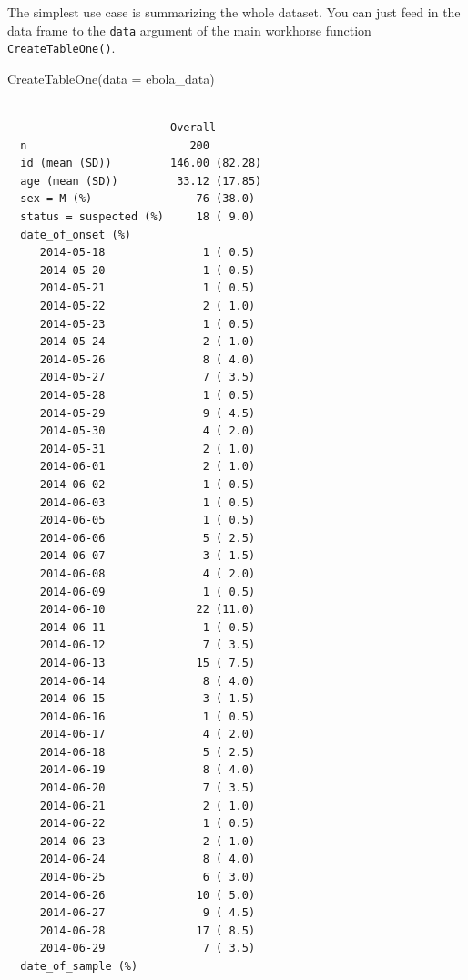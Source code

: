 \documentclass[
  letterpaper,
  DIV=11,
  numbers=noendperiod]{scrreprt}
\newenvironment{Shaded}{\begin{snugshade}}{\end{snugshade}}
\newcommand{\AttributeTok}[1]{\textcolor[rgb]{0.40,0.45,0.13}{#1}}
\newcommand{\FunctionTok}[1]{\textcolor[rgb]{0.28,0.35,0.67}{#1}}
\newcommand{\NormalTok}[1]{\textcolor[rgb]{0.00,0.23,0.31}{#1}}
\begin{document}
The simplest use case is summarizing the whole dataset. You can just
feed in the data frame to the \texttt{data} argument of the main
workhorse function \texttt{CreateTableOne()}.

\begin{Shaded}
\begin{Highlighting}[]
\FunctionTok{CreateTableOne}\NormalTok{(}\AttributeTok{data =}\NormalTok{ ebola\_data)}
\end{Highlighting}
\end{Shaded}

\begin{verbatim}
                        
                         Overall       
  n                         200        
  id (mean (SD))         146.00 (82.28)
  age (mean (SD))         33.12 (17.85)
  sex = M (%)                76 (38.0) 
  status = suspected (%)     18 ( 9.0) 
  date_of_onset (%)                    
     2014-05-18               1 ( 0.5) 
     2014-05-20               1 ( 0.5) 
     2014-05-21               1 ( 0.5) 
     2014-05-22               2 ( 1.0) 
     2014-05-23               1 ( 0.5) 
     2014-05-24               2 ( 1.0) 
     2014-05-26               8 ( 4.0) 
     2014-05-27               7 ( 3.5) 
     2014-05-28               1 ( 0.5) 
     2014-05-29               9 ( 4.5) 
     2014-05-30               4 ( 2.0) 
     2014-05-31               2 ( 1.0) 
     2014-06-01               2 ( 1.0) 
     2014-06-02               1 ( 0.5) 
     2014-06-03               1 ( 0.5) 
     2014-06-05               1 ( 0.5) 
     2014-06-06               5 ( 2.5) 
     2014-06-07               3 ( 1.5) 
     2014-06-08               4 ( 2.0) 
     2014-06-09               1 ( 0.5) 
     2014-06-10              22 (11.0) 
     2014-06-11               1 ( 0.5) 
     2014-06-12               7 ( 3.5) 
     2014-06-13              15 ( 7.5) 
     2014-06-14               8 ( 4.0) 
     2014-06-15               3 ( 1.5) 
     2014-06-16               1 ( 0.5) 
     2014-06-17               4 ( 2.0) 
     2014-06-18               5 ( 2.5) 
     2014-06-19               8 ( 4.0) 
     2014-06-20               7 ( 3.5) 
     2014-06-21               2 ( 1.0) 
     2014-06-22               1 ( 0.5) 
     2014-06-23               2 ( 1.0) 
     2014-06-24               8 ( 4.0) 
     2014-06-25               6 ( 3.0) 
     2014-06-26              10 ( 5.0) 
     2014-06-27               9 ( 4.5) 
     2014-06-28              17 ( 8.5) 
     2014-06-29               7 ( 3.5) 
  date_of_sample (%)                   

\end{verbatim}
\end{document}
